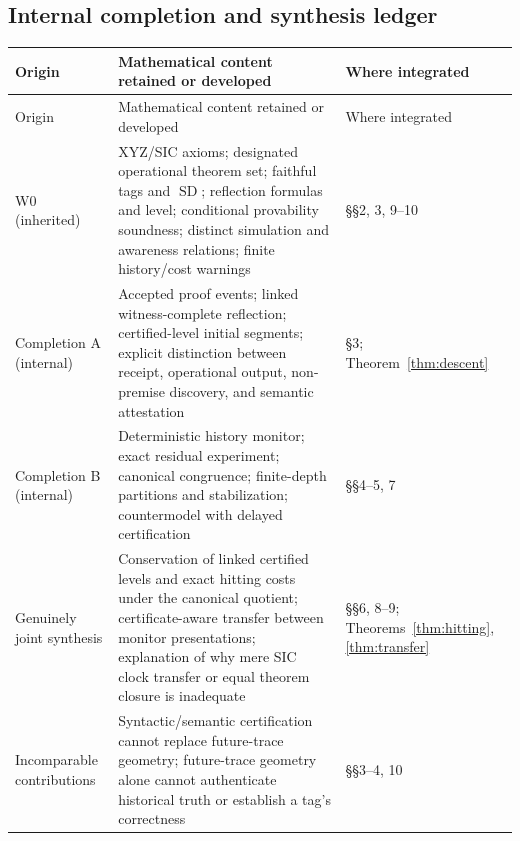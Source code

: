 \documentclass[11pt,letterpaper]{article}
\newcommand{\SD}{\operatorname{SD}}
\begin{document}
\subsection*{Internal completion and synthesis ledger}
\renewcommand{\arraystretch}{1.18}
\begin{longtable}{@{}p{}p{}p{}@{}}\toprule
Origin & Mathematical content retained or developed & Where integrated\\\midrule\endfirsthead
\toprule Origin & Mathematical content retained or developed & Where integrated\\\midrule\endhead
W0 (inherited) & XYZ/SIC axioms; designated operational theorem set; faithful tags and $\SD$; reflection formulas and level; conditional provability soundness; distinct simulation and awareness relations; finite history/cost warnings & \S\S2, 3, 9--10\\
Completion A (internal) & Accepted proof events; linked witness-complete reflection; certified-level initial segments; explicit distinction between receipt, operational output, non-premise discovery, and semantic attestation & \S3; Theorem~\ref{thm:descent}\\
Completion B (internal) & Deterministic history monitor; exact residual experiment; canonical congruence; finite-depth partitions and stabilization; countermodel with delayed certification & \S\S4--5, 7\\
Genuinely joint synthesis & Conservation of linked certified levels and exact hitting costs under the canonical quotient; certificate-aware transfer between monitor presentations; explanation of why mere SIC clock transfer or equal theorem closure is inadequate & \S\S6, 8--9; Theorems~\ref{thm:hitting}, \ref{thm:transfer}\\
Incomparable contributions & Syntactic/semantic certification cannot replace future-trace geometry; future-trace geometry alone cannot authenticate historical truth or establish a tag's correctness & \S\S3--4, 10\\
\bottomrule
\end{longtable}
\end{document}
